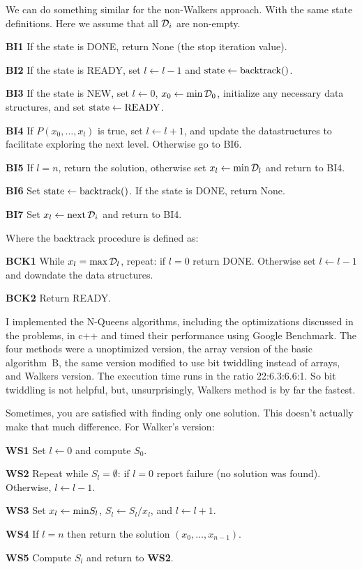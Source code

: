 We can do something similar for the non-Walkers approach.  With the same state
definitions.  Here we assume that all ${\cal D}_i$ are non-empty.

\vskip 0.1in
\item{\bf BI1} If the state is DONE, return None (the stop iteration value).
\item{\bf BI2} If the state is READY, set $l \leftarrow l - 1$ and 
 ${\rm state} \leftarrow {\rm backtrack}()$.
\item{\bf BI3} If the state is NEW, set $l \leftarrow 0$, 
 $x_0 \leftarrow {\rm min}\,{\cal D}_0$, initialize any necessary data 
 structures, and set ${\rm state} \leftarrow {\rm READY}$.
\item{\bf BI4} If $P\left(x_0, \ldots, x_l\right)$ is true, set 
 $l \leftarrow l + 1$, and update the datastructures to facilitate exploring the
 next level.  Otherwise go to BI6.
\item{\bf BI5} If $l = n$, return the solution, otherwise set 
 $x_l \leftarrow {\rm min}\,{\cal D}_l$ and return to BI4.
\item{\bf BI6} Set ${\rm state} \leftarrow {\rm backtrack}()$.  If the state is
  DONE, return None.
\item{\bf BI7} Set $x_l \leftarrow {\rm next}\,{\cal D}_i$ and return to BI4.
\vskip 0.1in

\noindent Where the backtrack procedure is defined as:
\vskip 0.05in
\item {\bf BCK1} While $x_l = {\rm max}\,{\cal D}_l$, repeat: if $l = 0$
  return DONE.  Otherwise set $l \leftarrow l - 1$ and downdate the data
  structures.
\item {\bf BCK2} Return READY.
\vskip 0.1in

\noindent I implemented the N-Queens algorithms, including the optimizations
discussed in the problems, in c++ and timed their performance using
Google Benchmark.  The four methods were a  unoptimized
version, the array version of the basic algorithm~B, the
same version modified to use bit twiddling instead of arrays,
and Walkers version.  The execution time runs in the ratio
22:6.3:6.6:1.  So bit twiddling is not helpful, but, unsurprisingly,
Walkers method is by far the fastest.

Sometimes, you are satisfied with finding only one solution.  This doesn't
actually make that much difference.  For Walker's version:

\vskip 0.1in
\item{\bf WS1} Set $l \leftarrow 0$ and compute $S_0$.
\item{\bf WS2} Repeat while $S_l = \emptyset$: if $l = 0$ report failure
  (no solution was found).  Otherwise, $l \leftarrow l - 1$.
\item{\bf WS3} Set $x_l \leftarrow {\rm min} S_l$, 
 $S_l \leftarrow S_l / x_l$, and $l \leftarrow l + 1$.
\item{\bf WS4} If $l = n$ then return the solution 
  $\left(x_0, \ldots, x_{n-1}\right)$.
\item{\bf WS5} Compute $S_l$ and return to {\bf WS2}.
\vskip 0.1in

